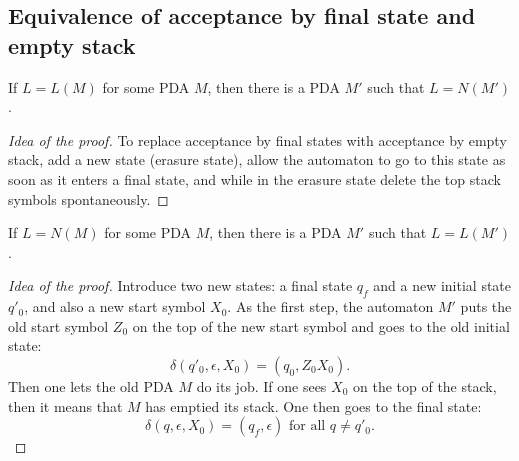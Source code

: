 \begin{page}

\subsection{Equivalence of acceptance by final state and empty stack}

\end{page}

\begin{page}

\begin{thm}
If $L = L(M)$ for some PDA $M$, then there is a PDA $M'$ such that $L = N(M')$.
\end{thm}

\end{page}

\begin{page}

\begin{proof}[Idea of the proof]
To replace acceptance by final states with acceptance by empty stack, add a new state (erasure state),
allow the automaton to go to this state as soon as it enters a final state,
and while in the erasure state delete the top stack symbols spontaneously.
\end{proof}


\end{page}

\begin{page}

\begin{thm}
If $L = N(M)$ for some PDA $M$, then there is a PDA $M'$ such that $L = L(M')$.
\end{thm}

\end{page}

\begin{page}

\begin{proof}[Idea of the proof]
Introduce two new states: a final state $q_f$ and a new initial state $q'_0$, and also a new start symbol $X_0$.
As the first step, the automaton $M'$ puts the old start symbol $Z_0$ on the top of the new start symbol and goes to the old initial state:
\[
\delta(q'_0, \epsilon, X_0) = (q_0, Z_0X_0).
\]
Then one lets the old PDA $M$ do its job.
If one sees $X_0$ on the top of the stack, then it means that $M$ has emptied its stack.
One then goes to the final state:
\[
\delta(q, \epsilon, X_0) = (q_f, \epsilon) \text{ for all }q \ne q'_0.
\]
\end{proof}



\end{page}

